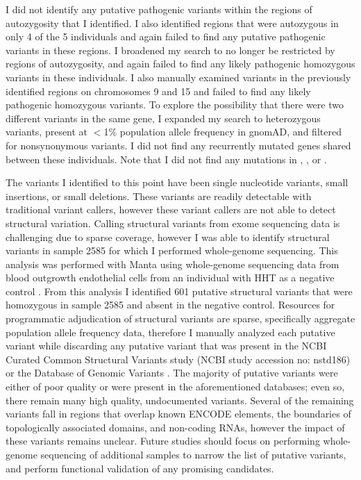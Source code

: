 I did not identify any putative pathogenic variants within the regions of autozygosity that I identified. I also identified regions that were autozygous in only 4 of the 5 individuals and again failed to find any putative pathogenic variants in these regions. I broadened my search to no longer be restricted by regions of autozygosity, and again failed to find any likely pathogenic homozygous variants in these individuals. I also manually examined variants in the previously identified regions on chromosomes 9 and 15 and failed to find any likely pathogenic homozygous variants. To explore the possibility that there were two different variants in the same gene, I expanded my search to heterozygous variants, present at $<$1\% population allele frequency in gnomAD, and filtered for nonsynonymous variants. I did not find any recurrently mutated genes shared between these individuals. Note that I did not find any mutations in , , or .

The variants I identified to this point have been single nucleotide variants, small insertions, or small deletions. These variants are readily detectable with traditional variant callers, however these variant callers are not able to detect structural variation. Calling structural variants from exome sequencing data is challenging due to sparse coverage, however I was able to identify structural variants in sample 2585 for which I performed whole-genome sequencing. This analysis was performed with Manta using whole-genome sequencing data from blood outgrowth endothelial cells from an individual with HHT as a negative control \citep{chen2016}. From this analysis I identified 601 putative structural variants that were homozygous in sample 2585 and absent in the negative control. Resources for programmatic adjudication of structural variants are sparse, specifically aggregate population allele frequency data, therefore I manually analyzed each putative variant while discarding any putative variant that was present in the NCBI Curated Common Structural Variants study (NCBI study accession no: nstd186) or the Database of Genomic Variants \citep{macdonald2014}. The majority of putative variants were either of poor quality or were present in the aforementioned databases; even so, there remain many high quality, undocumented variants. Several of the remaining variants fall in regions that overlap known ENCODE elements, the boundaries of topologically associated domains, and non-coding RNAs, however the impact of these variants remains unclear. Future studies should focus on performing whole-genome sequencing of additional samples to narrow the list of putative variants, and perform functional validation of any promising candidates. 







